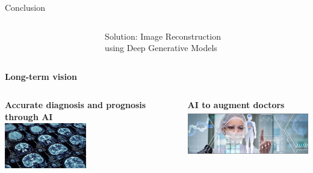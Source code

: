 \documentclass[8pt,xcolor=table,aspectratio=169]{beamer}
\begin{document}
\begin{frame}{Conclusion}
\begin{columns}[t]
\begin{column}{0.5\textwidth}
\end{column}
\begin{column}{0.5\textwidth}
\centering

 Solution: Image Reconstruction\\ using  Deep Generative Models\\
\vo
 \brgmoursshort

\end{column}
\end{columns}
 
\begin{center}
 \large{\textbf{Long-term vision}}
\end{center}
\vspace{-1em}
\begin{columns}[t]
\begin{column}{0.5\textwidth}
\centering

 \textbf{\large Accurate diagnosis and prognosis through AI}\\
 \includegraphics[height=2cm, trim=0 400 0 0,clip]{ai-diagnosis}
 
\end{column}
\begin{column}{0.5\textwidth}
\centering

 \textbf{\large AI to augment doctors}\\
\includegraphics[height=2cm]{ai_augment}
\end{column}
\end{columns}


 
\end{frame}
\end{document}
